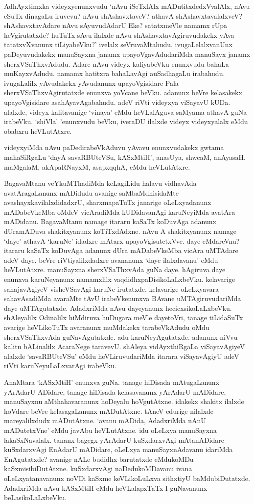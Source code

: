AdhAyxtimxka videyxyenunxvudu `nAvu iSeTxlAlx mADutitxdedxVvalAlx, nAvu eSuTx dinagaLu iruvevu? nAvu shAshavxtaveV? athavA shAshavxtavalalxveV? shAshavxtavAdare 
nAvu sAyuvudAdarU Eke? satatxmeVle namamx rUpa heVgirutatxde? huTuTx sAvu ilalxde nAvu shAshavxtavAgiruvudakekx yAva 
tatatxvXvanunx tiLiyabeVku?' ivelalx seVruvaMtahudu. ivugaLelalxvanUnx paDeyuvudakekx manuSayxna janamx upayoVgavAdudariMda manuSayx 
janamx sherxVSaThxvAdudu. Adare nAvu videyx kaliyabeVku enunxvudu bahaLa muKayxvAdudu. namamx hatitxra bahaLavAgi auSadhagaLu irabahudu. 
ivugaLalilx yAvudakekx yAvudanunx upayoVgisidare Pala sherxVSaThxvAgirutatxde enunxva yoVcane beVku. adanunx beVre kelasakekx upayoVgisidare 
asahAyavAgabahudu. adeV riVti videyxya viSayavU kUDa. alalxde, videyx kalitavanige `vinaya' eMdu heVLalAguva saMyama athavA 
guNa irabeVku. `shiVla' 'enunxvudu beVku, iveraDU ilalxde videyx videyxyalalx eMdu obabxru heVLutAtxre.

videyxyiMda nAvu paDedirabeVkAduvu yAvavu enunxvudakekx gwtama mahaSiRgaLu `dayA savaRBUteVSu, kASxMtiH', anasUya, shwcaM, 
anAyasaH, maMgalaM, akApaRNayxM, asapxqqhA, eMdu heVLutAtxre.

BagavaMtanu veYkuMThadiMda keLagiLidu halavu vidhavAda avatAragaLanunx mADidudu avanige saMbaMdhisidaMte avashayxkavilalxdidadxrU, sharxmapaTuTx janarige 
oLeLxyadanunx mADabeVkeMba oMdeV vicAradiMda kUDidavanAgi karuNeyiMda avatAra mADidanu. BagavaMtanu namage itararu kaSaTx 
koDuvAga adanunx dUramADuva shakitxyanunx koTiTxdAdxne. nAvu A shakitxyanunx namage `daye' athavA `karuNe' idadxre mAtarx upayoVgisutetxVve. daye 
eMdareVnu? itararu kaSaTx koDuvAga adanunx dUra mADabeVkeMba vicAra uMTAdare adeV daye. beVre riVtiyalilxdadxre avananunx `daye ilalxdavanu' eMdu 
heVLutAtxre. manuSayxna sherxVSaThxvAda guNa daye. hAgiruva daye enunxva karuNeyanunx namamxlilx vaqdidhxpaDisikoLaLxbeVku. kelavarige sahajavAgiyeV 
visheVSavAgi karuNe irutatxde. kelavarige oLeLxyavara sahavAsadiMda avaraMte tAvU irabeVkenunxva BAvane uMTAgiruvudariMda daye 
uMTAgutatxde. AdadxriMda nAvu dayeyanunx hecicxsikoLaLxbeVku. shAleyalilx Odinalilx hiMdiruva huDugara meVle dayetoVri, tanage tiLidaSuTx 
avarige heVLikoTuTx avaranunx muMdakekx tarabeVkAdudu oMdu sherxVSaThxvAda guNavAgutatxde. adu karuNeyAgutatxde. adanunx niVvu kalitu bALinalilx 
AcaraNege taravevU. shAleya vidAyxthiRgaLa viSayavAgiyeV alalxde `savaRBUteVSu' eMdu heVLiruvudariMda itarara viSayavAgiyU adeV riVti karuNeyuLaLxvarAgi irabeVku. 

AnaMtara `kASxMtiH' enunxva guNa. tanage hiDisada mAtugaLanunx yArAdarU ADidare, tanage hiDisada kelasavanunx yArAdarU 
mADidare, manuSayxnu aMthahavaranunx hoDeyalu hoVgutAtxne. idakekx shakitx ilalxde hoVdare beVre kelasagaLanunx mADutAtxne. 
tAneV edurige nilalxde mareyalilxdudx mADutAtxne. `avanu mADida, AdadxriMda nAnU mADutetxVne' eMdu javAbu heVLutAtxne. idu oLeLxya 
manuSayxna lakaSxNavalalx. tananx bagegx yArAdarU kuSxdarxvAgi mAtanADidare kuSxdarxvAgi EnAdarU mADidare, oLeLxya manuSayxnAdavanu idariMda 
EnAgutatxde? avanige nALe budidhx barutatxde eMdukoMDu kaSxmisibiDutAtxne. kuSxdarxvAgi naDedukoMDavanu ivana oLeLxyatanavanunx noVDi 
kaSxme keVLikoLuLxva sithxtiyU baMdubiDutatxde. AdadxriMda nAvu kASxMtiH eMdu heVLalapxTaTx I guNavanunx beLasikoLaLxbeVku.

